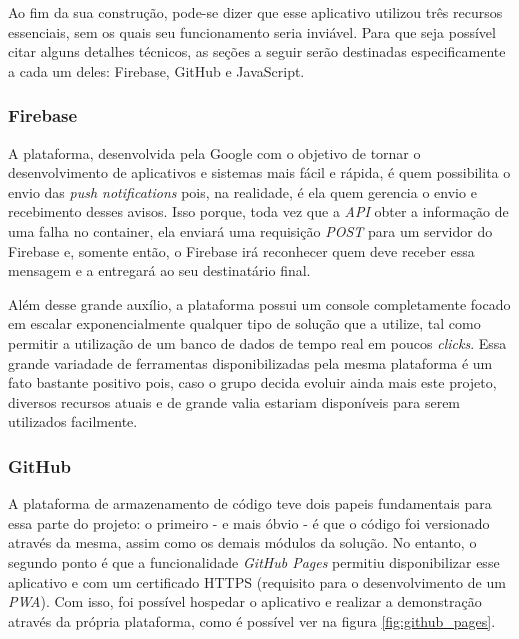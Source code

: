 Ao fim da sua construção, pode-se dizer que esse aplicativo utilizou três recursos essenciais, sem os quais seu funcionamento seria inviável. Para que seja possível citar alguns detalhes técnicos, as seções a seguir serão destinadas especificamente a cada um deles: Firebase, GitHub e JavaScript.

\subsubsection{Firebase}
\label{subsubsec:firebase}

A plataforma, desenvolvida pela Google com o objetivo de tornar o desenvolvimento de aplicativos e sistemas mais fácil e rápida, é quem possibilita o envio das \textit{push notifications} pois, na realidade, é ela quem gerencia o envio e recebimento desses avisos. Isso porque, toda vez que a \textit{API} obter a informação de uma falha no container, ela enviará uma requisição \textit{POST} para um servidor do Firebase e, somente então, o Firebase irá reconhecer quem deve receber essa mensagem e a entregará ao seu destinatário final.

Além desse grande auxílio, a plataforma possui um console completamente focado em escalar exponencialmente qualquer tipo de solução que a utilize, tal como permitir a utilização de um banco de dados de tempo real em poucos \textit{clicks}. Essa grande variadade de ferramentas disponibilizadas pela mesma plataforma é um fato bastante positivo pois, caso o grupo decida evoluir ainda mais este projeto, diversos recursos atuais e de grande valia estariam disponíveis para serem utilizados facilmente.


\subsubsection{GitHub}
\label{subsubsec:github}

A plataforma de armazenamento de código teve dois papeis fundamentais para essa parte do projeto: o primeiro - e mais óbvio - é que o código foi versionado através da mesma, assim como os demais módulos da solução. No entanto, o segundo ponto é que a funcionalidade \textit{GitHub Pages} permitiu disponibilizar esse aplicativo \online{} e com um certificado HTTPS (requisito para o desenvolvimento de um \textit{PWA}). Com isso, foi possível hospedar o aplicativo e realizar a demonstração através da própria plataforma, como é possível ver na figura \ref{fig:github_pages}.

